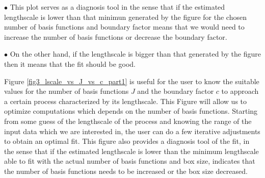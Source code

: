 \documentclass[]{interact}
\theoremstyle{plain}%
\theoremstyle{definition}
\theoremstyle{remark}
\begin{document}
$\bullet$ This plot serves as a diagnosis tool in the sense that if the estimated lengthscale is lower than that minimun generated by the figure for the chosen number of basis functions and boundary factor means that we would need to increase the number of basis functions or decrease the boundary factor.

$\bullet$ On the other hand, if the lengthscale is bigger than that generated by the figure then it means that the fit should be good.

Figure \ref{fig3_lscale_vs_J_vs_c_part1} is useful for the user to know the suitable values for the number of basis functions $J$ and the boundary factor $c$ to approach a certain process characterized by its lengthscale. This Figure will allow us to optimize computations which depends on the number of basis functions. Starting from some guess of the lengthscale of the process and knowing the range of the input data which we are interested in, the user can do a few iterative adjustments to obtain an optimal fit. This figure also provides a diagnosis tool of the fit, in the sense that if the estimated lengthscale is lower than the minimum lengthscale able to fit with the actual number of basis functions and box size, indicates that the number of basis functions needs to be increased or the box size decreased. 
\end{document}
